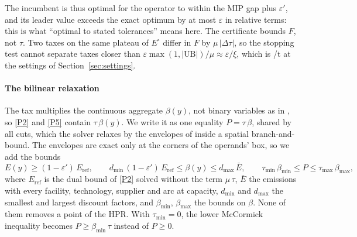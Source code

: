 \documentclass[review,11pt,nonatbib]{elsarticle}
\theoremstyle{remark}
\newcommand{\tmin}{\tau_{\min}}
\newcommand{\tmax}{\tau_{\max}}
\newcommand{\Eref}{E_{\mathrm{ref}}}
\newcommand{\Ebar}{\bar{E}}
\newcommand{\EUR}{\texteuro}
\begin{document}
The incumbent is thus optimal for the operator to within the MIP gap plus $\varepsilon'$, and its leader value exceeds the exact optimum by at most $\varepsilon$ in relative terms: this is what ``optimal to stated tolerances'' means here. The certificate bounds $F$, not $\tau$. Two taxes on the same plateau of $E^\circ$ differ in $F$ by $\mu\,|\Delta\tau|$, so the stopping test cannot separate taxes closer than $\varepsilon \max(1, |\mathrm{UB}|)/\mu \approx \varepsilon/\xi$, which is \EUR1/t at the settings of Section~\ref{sec:settings}.

\paragraph{The bilinear relaxation} The tax multiplies the continuous aggregate $\beta(y)$, not binary variables as in \textcite{soares2021deterministic}, so \eqref{P2} and \eqref{P5} contain $\tau\,\beta(y)$. We write it as one equality $P = \tau\,\beta$, shared by all cuts, which the solver relaxes by the envelopes of \textcite{mccormick1976computability} inside a spatial branch-and-bound. The envelopes are exact only at the corners of the operands' box, so we add the bounds
\begin{equation}\label{eq:hpr-bounds}
E(y) \ge (1 - \varepsilon')\,\Eref, \qquad d_{\min}\, (1 - \varepsilon')\,\Eref \le \beta(y) \le d_{\max}\, \Ebar, \qquad \tmin\, \beta_{\min} \le P \le \tmax\, \beta_{\max},
\end{equation}
where $\Eref$ is the dual bound of \eqref{P2} solved without the term $\mu\,\tau$, $\Ebar$ the emissions with every facility, technology, supplier and arc at capacity, $d_{\min}$ and $d_{\max}$ the smallest and largest discount factors, and $\beta_{\min}$, $\beta_{\max}$ the bounds on $\beta$. None of them removes a point of the HPR. With $\tmin = 0$, the lower McCormick inequality becomes $P \ge \beta_{\min}\,\tau$ instead of $P \ge 0$.
\end{document}

